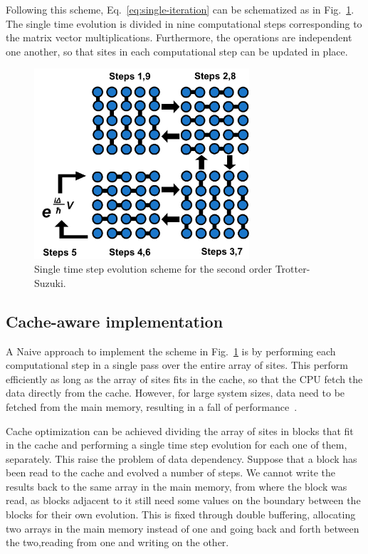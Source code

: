 Following this scheme, Eq.~\eqref{eq:single-iteration} can be schematized as in Fig.~\ref{fig:scheme-iteration}. The single time evolution is divided in nine computational steps corresponding to the matrix vector multiplications. Furthermore, the operations are independent one another, so that sites in each computational step can be updated in place.
\begin{figure}
   \centering
   \includegraphics[width=8cm]{Figs/Single_time_step_evolution.png}
   \caption{Single time step evolution scheme for the second order Trotter-Suzuki.} \label{fig:scheme-iteration}
\end{figure}

\subsection{Cache-aware implementation}
A Naive approach to implement the scheme in Fig.~\ref{fig:scheme-iteration} is by performing each computational step in a single pass over the entire array of sites. This perform efficiently as long as the array of sites fits in the cache, so that the CPU fetch the data directly from the cache. However, for large system sizes, data need to be fetched from the main memory, resulting in a fall of performance~\citep{bederian2011boosting}. 

Cache optimization can be achieved dividing the array of sites in blocks that fit in the cache and performing a single time step evolution for each one of them, separately. This raise the problem of data dependency. Suppose that a block has been read to the cache and evolved a number of steps. We cannot write the results back to the same array in the main memory, from where the block was read, as blocks adjacent to it still need some values on the boundary between the blocks for their own evolution. This is fixed through double buffering, allocating two arrays in the main memory instead of one and going back and forth between the two,reading from one and writing on the other.

